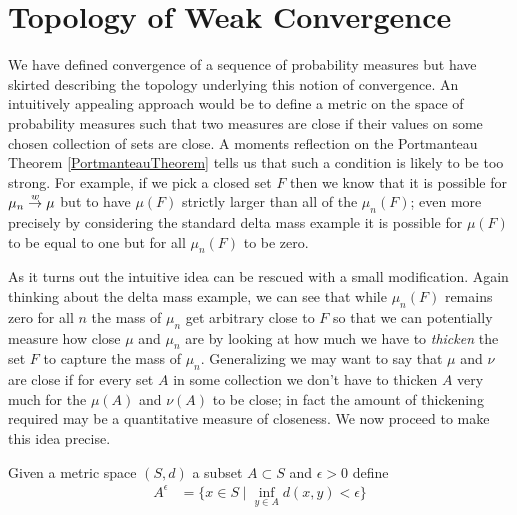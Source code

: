 \section{Topology of Weak Convergence}
We have defined convergence of a sequence of probability measures but
have skirted describing the topology underlying this notion of
convergence. An intuitively appealing approach would be to define a
metric on the space of probability measures such that two measures are
close if their values on some chosen collection of sets are close.  A
moments reflection on the Portmanteau Theorem \ref{PortmanteauTheorem}
tells us that such a condition is likely to be too strong.  For
example, if we pick a closed set $F$ then we know that it is possible
for $\mu_n \overset{w}\to \mu$ but to have $\mu(F)$ strictly larger than all
of the $\mu_n(F)$; even more precisely by considering the standard
delta mass example it is possible for $\mu(F)$ to be equal to one but
for all $\mu_n(F)$ to be zero.  

As it turns out the intuitive idea can be rescued with a small
modification.  Again thinking about the delta mass example, we can see
that while $\mu_n(F)$ remains zero for all $n$ the mass of $\mu_n$ get
arbitrary close to $F$ so that we can potentially measure how close
$\mu$ and $\mu_n$ are by looking at how much we have to \emph{thicken}
the set $F$ to capture the mass of $\mu_n$.  Generalizing we may want
to say that $\mu$ and $\nu$ are close if for every set $A$ in some
collection we don't have to thicken $A$ very much for the $\mu(A)$ and
$\nu(A)$ to be close; in fact the amount of thickening required may be a
quantitative measure of closeness.  We now proceed to make this idea precise.

\begin{defn}Given a metric space $(S,d)$ a subset $A \subset S$ and
$\epsilon > 0$ define
\begin{align*}
A^\epsilon &= \lbrace x \in S \mid \inf_{y \in A} d(x,y) < \epsilon \rbrace
\end{align*}
\end{defn} 

